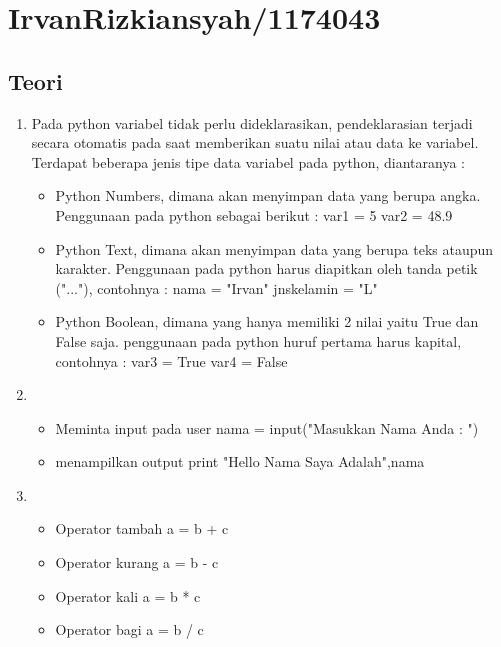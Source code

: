 
\section{IrvanRizkiansyah/1174043}
	\subsection{Teori}
		\begin{enumerate}
			\item Pada python variabel tidak perlu dideklarasikan, pendeklarasian terjadi secara otomatis pada saat memberikan suatu nilai atau data ke variabel. Terdapat beberapa jenis tipe data variabel pada python, diantaranya :
				\begin{itemize}
					\item Python Numbers, dimana akan menyimpan data yang berupa angka. Penggunaan pada python sebagai berikut : 
					var1 = 5
					var2 = 48.9
					
					\item Python Text, dimana akan menyimpan data yang berupa teks ataupun karakter. Penggunaan pada python harus diapitkan oleh tanda petik ("..."), contohnya :
					nama = "Irvan"
					jnskelamin = "L"
					
					\item Python Boolean, dimana yang hanya memiliki 2 nilai yaitu True dan False saja. penggunaan pada python huruf pertama harus kapital, contohnya :
					var3 = True
					var4 = False
				\end{itemize}

			\item \begin{itemize}
					\item Meminta input pada user
					nama = input("Masukkan Nama Anda : ")
					
					\item menampilkan output
					print "Hello Nama Saya Adalah",nama
				\end{itemize}

			\item \begin{itemize}
					\item Operator tambah
					a = b + c
					
					\item Operator kurang
					a = b - c
					
					\item Operator kali
					a = b * c
					
					\item Operator bagi
					a = b / c
					

\end{itemize}
\end{enumerate}
